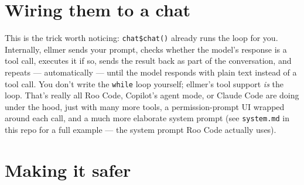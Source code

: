 \documentclass[
  letterpaper,
  DIV=11,
  numbers=noendperiod]{scrreprt}
\newenvironment{Shaded}{\begin{snugshade}}{\end{snugshade}}
\newcommand{\AttributeTok}[1]{\textcolor[rgb]{0.40,0.45,0.13}{#1}}
\newcommand{\FunctionTok}[1]{\textcolor[rgb]{0.28,0.35,0.67}{#1}}
\newcommand{\NormalTok}[1]{\textcolor[rgb]{0.00,0.23,0.31}{#1}}
\newcommand{\OtherTok}[1]{\textcolor[rgb]{0.00,0.23,0.31}{#1}}
\newcommand{\SpecialCharTok}[1]{\textcolor[rgb]{0.37,0.37,0.37}{#1}}
\newcommand{\StringTok}[1]{\textcolor[rgb]{0.13,0.47,0.30}{#1}}
\begin{document}
\section{Wiring them to a chat}\label{wiring-them-to-a-chat}

\begin{Shaded}
\end{Shaded}

This is the trick worth noticing: \texttt{chat\$chat()} already runs the
loop for you. Internally, ellmer sends your prompt, checks whether the
model's response is a tool call, executes it if so, sends the result
back as part of the conversation, and repeats --- automatically ---
until the model responds with plain text instead of a tool call. You
don't write the \texttt{while} loop yourself; ellmer's tool support
\emph{is} the loop. That's really all Roo Code, Copilot's agent mode, or
Claude Code are doing under the hood, just with many more tools, a
permission-prompt UI wrapped around each call, and a much more elaborate
system prompt (see \texttt{system.md} in this repo for a full example
--- the system prompt Roo Code actually uses).

\section{Making it safer}\label{making-it-safer}
\end{document}
